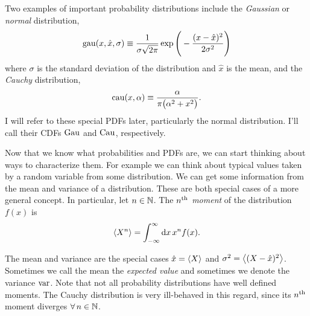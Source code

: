 \begin{example*}{}{}
Two examples of important probability distributions include the {\it Gaussian}
or {\it normal} distribution,
\begin{equation}
  \operatorname{gau}(x,\hat{x},\sigma)\equiv\frac{1}{\sigma\sqrt{2\pi}}
  \exp\Bigg(-\frac{(x-\hat{x})^2}{2\sigma^2}\Bigg)
\end{equation}
where $\sigma$ is the standard deviation of the distribution and $\hat{x}$ is 
the mean, and the {\it Cauchy}  distribution,
\begin{equation}
  \operatorname{cau}(x,\alpha)\equiv\frac{\alpha}{\pi\big(\alpha^2+x^2\big)}.
\end{equation}
I will refer to these special PDFs later, particularly the normal distribution.
I'll call their CDFs $\operatorname{Gau}$ and $\operatorname{Cau}$, respectively.   
\end{example*}

Now that we know what probabilities and PDFs are, we can start thinking about
ways to characterize them. For example we can think about typical values taken
by a random variable from some distribution. We can get some information
from the mean and variance of a distribution. These are
both special cases of a more general concept.
In particular, let $n\in\mathbb{N}$.
  The {\it $n{}^{\rm th}$ moment} of the distribution $f(x)$ is
  \begin{equation}\label{dfn:mom}
    \ev{X^n}=\int_{-\infty}^\infty\dd{x}x^nf(x).
  \end{equation}

The mean and variance are the special cases $\hat{x}=\ev{X}$ and 
$\sigma^2=\ev{(X-\hat{x})^2}$. Sometimes we call the mean the {\it expected
value} and sometimes we denote the variance $\operatorname{var}$. Note that not all 
probability distributions have well defined moments. The Cauchy distribution is
very ill-behaved in this regard, since its $n{}^{\rm th}$ moment diverges
$\operatorname{\forall} n\in\mathbb{N}$.

